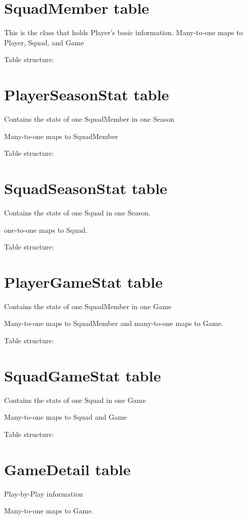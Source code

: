 \documentclass[letterpaper,10pt,english]{sphinxmanual}
\begin{document}
\section{SquadMember table}
\label{_static/database:squadmember-table}
This is the class that holds Player's basic information.
Many-to-one maps to Player, Squad, and Game

Table structure:


\section{PlayerSeasonStat table}
\label{_static/database:playerseasonstat-table}
Contains the stats of one SquadMember in one Season

Many-to-one maps to SquadMember

Table structure:


\section{SquadSeasonStat table}
\label{_static/database:squadseasonstat-table}
Contains the stats of one Squad in one Season.

one-to-one maps to Squad.

Table structure:


\section{PlayerGameStat table}
\label{_static/database:playergamestat-table}
Contains the stats of one SquadMember in one Game

Many-to-one maps to SquadMember and many-to-one maps
to Game.

Table structure:


\section{SquadGameStat table}
\label{_static/database:squadgamestat-table}
Contains the stats of one Squad in one Game

Many-to-one maps to Squad and Game

Table structure:


\section{GameDetail table}
\label{_static/database:gamedetail-table}
Play-by-Play information

Many-to-one maps to Game.
\end{document}
